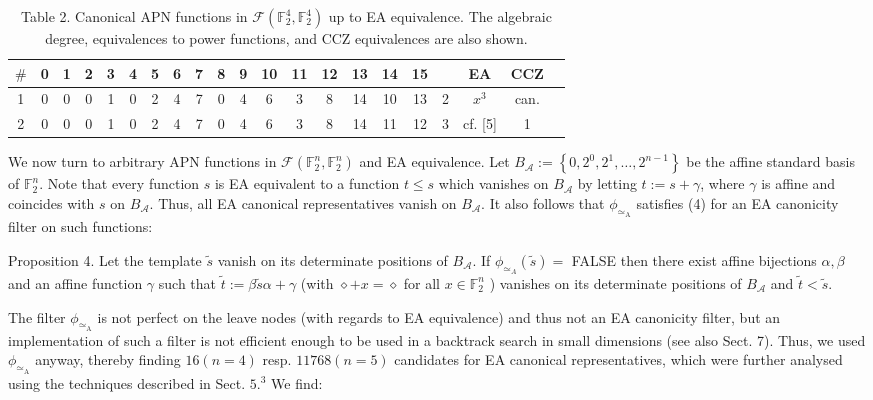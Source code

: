 \documentclass[10pt]{article}
\begin{document}
\begin{table}[h]
\begin{center}
\captionsetup{labelformat=empty}
\caption{Table 2. Canonical APN functions in $\mathcal{F}\left(\mathbb{F}_{2}^{4}, \mathbb{F}_{2}^{4}\right)$ up to EA equivalence. The algebraic degree, equivalences to power functions, and CCZ equivalences are also shown.}
\begin{tabular}{|c|ccccccccccccccccc|c|c|c|}
\hline
$\#$ & 0 & 1 & 2 & 3 & 4 & 5 & 6 & 7 & 8 & 9 & 10 & 11 & 12 & 13 & 14 & 15 &  & EA & CCZ \\
\hline
1 & 0 & 0 & 0 & 1 & 0 & 2 & 4 & 7 & 0 & 4 & 6 & 3 & 8 & 14 & 10 & 13 & 2 & $x^{3}$ & can. \\
2 & 0 & 0 & 0 & 1 & 0 & 2 & 4 & 7 & 0 & 4 & 6 & 3 & 8 & 14 & 11 & 12 & 3 & cf. [5] & 1 \\
\hline
\end{tabular}
\end{center}
\end{table}

We now turn to arbitrary APN functions in $\mathcal{F}\left(\mathbb{F}_{2}^{n}, \mathbb{F}_{2}^{n}\right)$ and EA equivalence. Let $B_{\mathcal{A}}:=\left\{0,2^{0}, 2^{1}, \ldots, 2^{n-1}\right\}$ be the affine standard basis of $\mathbb{F}_{2}^{n}$. Note that every function $s$ is EA equivalent to a function $t \leq s$ which vanishes on $B_{\mathcal{A}}$ by letting $t:=s+\gamma$, where $\gamma$ is affine and coincides with $s$ on $B_{\mathcal{A}}$. Thus, all EA canonical representatives vanish on $B_{\mathcal{A}}$. It also follows that $\phi_{\simeq_{\mathrm{A}}}$ satisfies (4) for an EA canonicity filter on such functions:

Proposition 4. Let the template $\tilde{s}$ vanish on its determinate positions of $B_{\mathcal{A}}$. If $\phi_{\simeq_{A}}(\tilde{s})=$ FALSE then there exist affine bijections $\alpha, \beta$ and an affine function $\gamma$ such that $\tilde{t}:=\beta \tilde{s} \alpha+\gamma$ (with $\diamond+x=\diamond$ for all $x \in \mathbb{F}_{2}^{n}$ ) vanishes on its determinate positions of $B_{\mathcal{A}}$ and $\tilde{t}<\tilde{s}$.

The filter $\phi_{\simeq_{\mathrm{A}}}$ is not perfect on the leave nodes (with regards to EA equivalence) and thus not an EA canonicity filter, but an implementation of such a filter is not efficient enough to be used in a backtrack search in small dimensions (see also Sect. 7). Thus, we used $\phi_{\simeq_{\mathrm{A}}}$ anyway, thereby finding $16(n=4)$ resp. $11768(n=5)$ candidates for EA canonical representatives, which were further analysed using the techniques described in Sect. $5 .^{3}$ We find:
\end{document}
